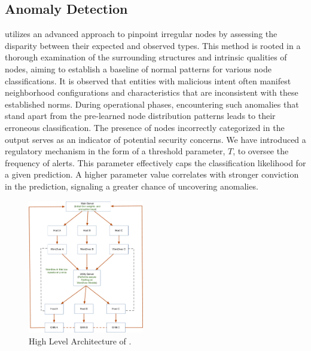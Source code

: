 \subsection{Anomaly Detection}
\Sys utilizes an advanced approach to pinpoint irregular nodes by assessing the disparity between their expected and observed types. This method is rooted in a thorough examination of the surrounding structures and intrinsic qualities of nodes, aiming to establish a baseline of normal patterns for various node classifications. It is observed that entities with malicious intent often manifest neighborhood configurations and characteristics that are inconsistent with these established norms. During operational phases, encountering such anomalies that stand apart from the pre-learned node distribution patterns leads to their erroneous classification. The presence of nodes incorrectly categorized in the output serves as an indicator of potential security concerns. We have introduced a regulatory mechanism in the form of a threshold parameter, $T$, to oversee the frequency of alerts. This parameter effectively caps the classification likelihood for a given prediction. A higher parameter value correlates with stronger conviction in the prediction, signaling a greater chance of uncovering anomalies.


\begin{figure}[t!]
    \centering
    \includegraphics[width=0.45\textwidth]{fig/arch.pdf}
    \caption{High Level Architecture of \Sys. }
    \vspace{-3ex}
    \label{arch}
  \end{figure}
